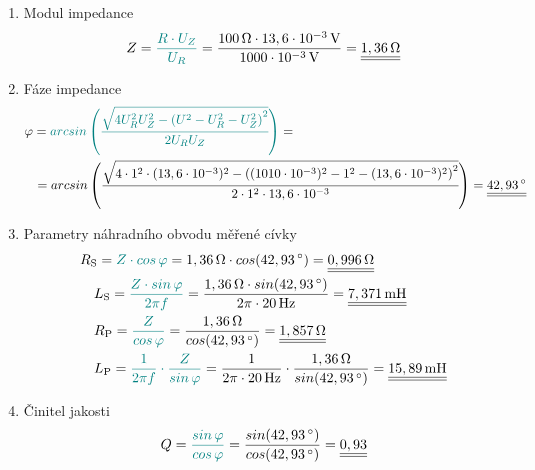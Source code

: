 \documentclass[a4paper, czech]{article}
\begin{document}
\begin{enumerate}
    \item Modul impedance
    \begin{multline*}
        Z = \textcolor{teal}{\frac{R \cdot U_Z}{U_R}} = \frac{100\,\Omega \cdot 13,6 \cdot 10^{-3}\,\text{V}}{1000 \cdot 10^{-3}\,\text{V}} = \underline{\underline{1,36\,\Omega}} \hfill
    \end{multline*}
    \item Fáze impedance
    \begin{multline*}
        \varphi = \textcolor{teal}{arcsin \left(\cfrac{\sqrt{4 U^2_R U^2_Z - \left(U^2 - U^2_R - U^2_Z\right)^2}}{2 U_R U_Z}\right)} = \hfill \\
        \ \ \ = arcsin \left(\cfrac{\sqrt{4 \cdot 1^2 \cdot (13,6 \cdot 10^{-3})^2 - \left((1010 \cdot 10^{-3})^2 - 1^2 - (13,6 \cdot 10^{-3})^2\right)^2}}{2 \cdot 1^2 \cdot 13,6 \cdot 10^{-3}}\right) =
        \underline{\underline{42,93\,\degree}} \hfill
    \end{multline*}
    \item Parametry náhradního obvodu měřené cívky
    \begin{multline*}
        R_\text{S} = \textcolor{teal}{Z \cdot cos\,\varphi} = 1,36\,\Omega \cdot cos (42,93\,\degree) = \underline{\underline{0,996\,\Omega}} \hfill \\
        \ \ \ L_\text{S} = \textcolor{teal}{\frac{Z \cdot sin\,\varphi}{2 \pi f}} = \frac{1,36\,\Omega \cdot sin(42,93\,\degree)}{2 \pi \cdot 20\,\text{Hz}} = \underline{\underline{7,371\,\text{mH}}} \hfill \\
        \ \ \ R_\text{P} = \textcolor{teal}{\frac{Z}{cos\,\varphi}} = \frac{1,36\,\Omega}{cos (42,93\,\degree)} = \underline{\underline{1,857\,\Omega}} \hfill \\
        \ \ \ L_\text{P} = \textcolor{teal}{\frac{1}{2 \pi f} \cdot \frac{Z}{sin\,\varphi}} = \frac{1}{2 \pi \cdot 20\,\text{Hz}} \cdot \frac{1,36\,\Omega}{sin(42,93\,\degree)} = \underline{\underline{15,89\,\text{mH}}} \hfill
    \end{multline*}
    \item Činitel jakosti
    \begin{multline*}
        Q = \textcolor{teal}{\frac{sin\,\varphi}{cos\,\varphi}} = \frac{sin(42,93\,\degree)}{cos(42,93\,\degree)} = \underline{\underline{0,93}} \hfill
    \end{multline*}
\end{enumerate}

\pagebreak
\end{document}
